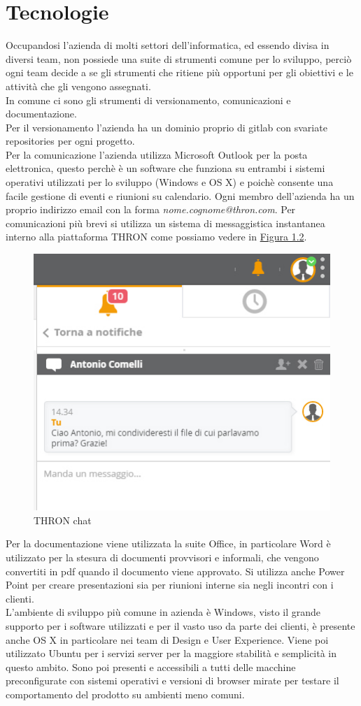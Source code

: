 \documentclass[a4paper, 12pt, twoside, openright]{book}
\begin{document}
\newpage{}
\section{Tecnologie}
Occupandosi l'azienda di molti settori dell'informatica, ed essendo divisa in diversi team, non possiede una suite di strumenti comune per lo sviluppo, perciò ogni team decide a se gli strumenti che ritiene più opportuni per gli obiettivi e le attività che gli vengono assegnati.\\
In comune ci sono gli strumenti di versionamento, comunicazioni e documentazione.\\
Per il versionamento l'azienda ha un dominio proprio di gitlab con svariate repositories per ogni progetto.\\
Per la comunicazione l'azienda utilizza Microsoft Outlook per la posta elettronica, questo perchè è un software che funziona su entrambi i sistemi operativi utilizzati per lo sviluppo (Windows e OS X) e poichè consente una facile gestione di eventi e riunioni su calendario. Ogni membro dell'azienda ha un proprio indirizzo email con la forma \textit{nome.cognome@thron.com}. Per comunicazioni più brevi si utilizza un sistema di messaggistica instantanea interno alla piattaforma THRON come possiamo vedere in \hyperref[esempio-chat]{Figura 1.2}.
\begin{figure}[H]
	\centering
	\label{esempio-chat}
	\includegraphics[scale=0.5]{images/esempio-chat.jpg}
	\caption{THRON chat}
\end{figure}
Per la documentazione viene utilizzata la suite Office, in particolare Word è utilizzato per la stesura di documenti provvisori e informali, che vengono convertiti in pdf quando il documento viene approvato. Si utilizza anche Power Point per creare presentazioni sia per riunioni interne sia negli incontri con i clienti.\\
L'ambiente di sviluppo più comune in azienda è Windows, visto il grande supporto per i software utilizzati e per il vasto uso da parte dei clienti, è presente anche OS X in particolare nei team di Design e User Experience. Viene poi utilizzato Ubuntu per i servizi server per la maggiore stabilità e semplicità in questo ambito. Sono poi presenti e accessibili a tutti delle macchine preconfigurate con sistemi operativi e versioni di browser mirate per testare il comportamento del prodotto su ambienti meno comuni.
\end{document}
